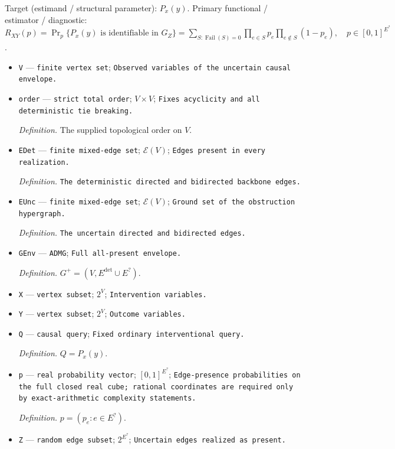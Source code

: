 \documentclass{article}
\begin{document}
Target (estimand / structural parameter): \(P_x(y)\).
Primary functional / estimator / diagnostic: \(R_{XY}(p)=\Pr_p\{P_x(y)\text{ is identifiable in }G_Z\}=\sum_{S:\operatorname{Fail}(S)=0}\prod_{e\in S}p_e\prod_{e\notin S}(1-p_e),\quad p\in[0,1]^{E^{?}}\).
\begin{itemize}
  \item \texttt{V} --- \texttt{finite vertex set}; \texttt{Observed variables of the uncertain causal envelope.}
  \item \texttt{order} --- \texttt{strict total order}; \(V\times V\); \texttt{Fixes acyclicity and all deterministic tie breaking.}
  \par\smallskip\noindent\emph{Definition.} The supplied topological order on \(V\).
  \item \texttt{EDet} --- \texttt{finite mixed-\allowbreak{}edge set}; \(\mathcal E(V)\); \texttt{Edges present in every realization.}
  \par\smallskip\noindent\emph{Definition.} \texttt{The deterministic directed and bidirected backbone edges.}
  \item \texttt{EUnc} --- \texttt{finite mixed-\allowbreak{}edge set}; \(\mathcal E(V)\); \texttt{Ground set of the obstruction hypergraph.}
  \par\smallskip\noindent\emph{Definition.} \texttt{The uncertain directed and bidirected edges.}
  \item \texttt{GEnv} --- \texttt{ADMG}; \texttt{Full all-\allowbreak{}present envelope.}
  \par\smallskip\noindent\emph{Definition.} \(G^{+}=(V,E^{\mathrm{det}}\cup E^{?})\).
  \item \texttt{X} --- \texttt{vertex subset}; \(2^V\); \texttt{Intervention variables.}
  \item \texttt{Y} --- \texttt{vertex subset}; \(2^V\); \texttt{Outcome variables.}
  \item \texttt{Q} --- \texttt{causal query}; \texttt{Fixed ordinary interventional query.}
  \par\smallskip\noindent\emph{Definition.} \(Q=P_x(y)\).
  \item \texttt{p} --- \texttt{real probability vector}; \([0,1]^{E^{?}}\); \texttt{Edge-\allowbreak{}presence probabilities on the full closed real cube;\allowbreak{} rational coordinates are required only by exact-\allowbreak{}arithmetic complexity statements.}
  \par\smallskip\noindent\emph{Definition.} \(p=(p_e:e\in E^{?})\).
  \item \texttt{Z} --- \texttt{random edge subset}; \(2^{E^{?}}\); \texttt{Uncertain edges realized as present.}

\end{itemize}
\end{document}
